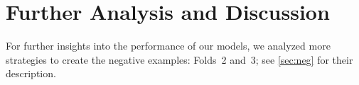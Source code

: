 \documentclass[smallextended]{svjour3}
\newcommand\0{\hphantom{0}}
\begin{document}
  





































































\section{Further Analysis and Discussion} \label{sec:analysisx}





















For further insights into the performance of our models, we analyzed more strategies to create the negative examples: Folds~2 and~3; see \cref{sec:neg} for their description.
\end{document}
